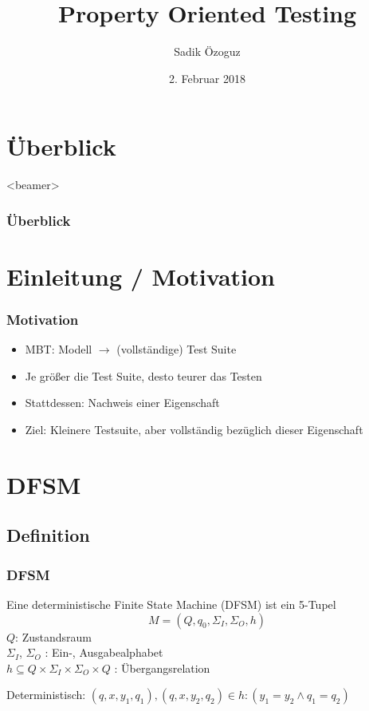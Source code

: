 \documentclass[10pt]{beamer}
\title{Property Oriented Testing}
\author{Sadik Özoguz}
\institute{Universit{\"a}t Bremen}
\date[02.02.2018]{2. Februar 2018}
\begin{document}
\begin{frame}
  \titlepage
\end{frame}

\section*{Überblick}
\begin{frame}<beamer>
  \frametitle{Überblick}
  \tableofcontents
\end{frame}

\section{Einleitung / Motivation}

\begin{frame}
  \frametitle{Motivation}
  \begin{itemize}
    \item MBT: Modell $\rightarrow$ (vollständige) Test Suite
    \item Je größer die Test Suite, desto teurer das Testen
    \item<2-> Stattdessen: Nachweis einer Eigenschaft
    \item<3-> Ziel: Kleinere Testsuite, aber vollständig bezüglich dieser Eigenschaft
  \end{itemize}
\end{frame}

\section{DFSM}
\subsection{Definition}
\begin{frame}
  \frametitle{DFSM}

  \begin{definition}
    Eine deterministische Finite State Machine (DFSM) ist ein 5-Tupel $$M=(Q,q_0,\Sigma_I,\Sigma_O,h)$$
    $Q$: Zustandsraum\\
    $\Sigma_I$, $\Sigma_O$ : Ein-, Ausgabealphabet\\
    $h \subseteq Q \times \Sigma_I \times \Sigma_O \times Q$ : Übergangsrelation 
  \end{definition}
  Deterministisch: $(q,x,y_1,q_1),(q,x,y_2,q_2) \in h: (y_1 = y_2 \wedge q_1 = q_2)$
\end{frame}
\end{document}

